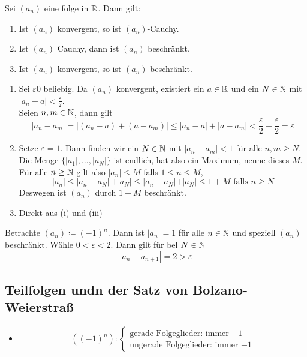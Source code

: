 \documentclass[consecutivenumbering]{gadsescript}
\begin{document}
\begin{subtheorem}
	Sei $ (a_n) $ eine folge in $ \mathbb{R} $. Dann gilt:
	\begin{enumerate}[label=(\roman*)]
		\item Ist $ (a_n) $ konvergent, so ist $ (a_n) $-Cauchy.
		\item Ist $ (a_n) $ Cauchy, dann ist $ (a_n) $ beschränkt.
		\item Ist $ (a_n) $ konvergent, so ist $ (a_n) $ beschränkt.
	\end{enumerate}
	\begin{subproof*}
		\begin{enumerate}[label=(\roman*)]
			\item Sei $ \varepsilon 0 $ beliebig. Da $ (a_n) $ konvergent, existiert ein $ a \in \mathbb{R} $ und ein $ N \in \mathbb{N} $ mit $ |a_n - a| < \frac{\varepsilon}{2} $.\\
				Seien $ n, m \in \mathbb{N} $, dann gilt
				\[ | a_n - a_m| = | (a_n - a) + (a- a_m)| \leq |a_n - a| + |a - a_m| < \frac{\varepsilon}{2} + \frac{\varepsilon}{2} = \varepsilon \]
			\item Setze $ \varepsilon = 1 $. Dann finden wir ein $ N \in \mathbb{N} $ mit $ |a_n - a_m| < 1 $ für alle $ n, m \geq N $.\\
				Die Menge $ \{ |a_1|,\dotsc, |a_N| \} $ ist endlich, hat also ein Maximum, nenne dieses $ M $.\\
				Für alle $ n \geq \mathbb{N} $ gilt also $ |a_n| \leq M $ falls $ 1 \leq n \leq M $,
				\[ |a_n| \leq |a_n - a_N| + a_N| \leq |a_n - a_N| + |a_N| \leq 1 + M \text{ falls } n \geq N \]
				Deswegen ist $ (a_n) $ durch $ 1 + M $ beschränkt.
			\item Direkt aus (i) und (iii)
		\end{enumerate}
	\end{subproof*}
\end{subtheorem}
\begin{subexample}
	Betrachte $ (a_n) \coloneqq (-1)^n $. Dann ist $ |a_n| = 1 $ für alle $ n \in \mathbb{N} $ und speziell $ (a_n) $ beschränkt. Wähle $ 0 < \varepsilon < 2 $. Dann gilt für bel $ N \in \mathbb{N} $
	\[ |a_n - a_{n+1}| = 2 > \varepsilon \]
\end{subexample}

\subsection{Teilfolgen undn der Satz von Bolzano-Weierstraß}
\begin{itemize}
	\item \[ ( ( -1 )^n ) : \begin{cases} \text{gerade Folgeglieder: immer $-1$}\\\text{ungerade Folgeglieder: immer $-1$} \end{cases} \]
\end{itemize}
\end{document}
